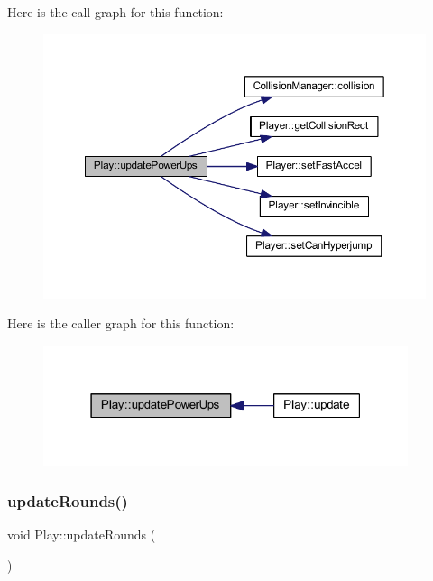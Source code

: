 Here is the call graph for this function\+:
\nopagebreak
\begin{figure}[H]
\begin{center}
\leavevmode
\includegraphics[width=350pt]{class_play_aa4cf498ba0e0f0d05305d749bd753137_cgraph}
\end{center}
\end{figure}
Here is the caller graph for this function\+:
\nopagebreak
\begin{figure}[H]
\begin{center}
\leavevmode
\includegraphics[width=303pt]{class_play_aa4cf498ba0e0f0d05305d749bd753137_icgraph}
\end{center}
\end{figure}
\mbox{\label{class_play_a3d795242eee0deb5e772e3cc85988829}} 
\subsubsection{\texorpdfstring{update\+Rounds()}{updateRounds()}}
{\footnotesize\ttfamily void Play\+::update\+Rounds (\begin{DoxyParamCaption}{ }\end{DoxyParamCaption})}

